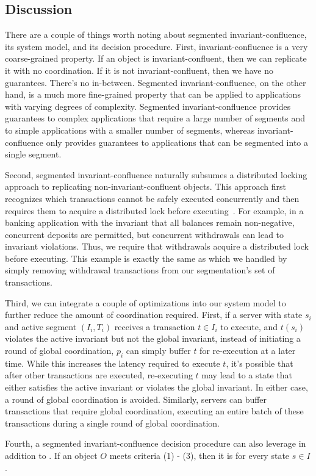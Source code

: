 \subsection{Discussion}
There are a couple of things worth noting about segmented invariant-confluence,
its system model, and its decision procedure. First, invariant-confluence is a
very coarse-grained property. If an object is invariant-confluent, then we can
replicate it with no coordination. If it is not invariant-confluent, then we
have no guarantees. There's no in-between. Segmented invariant-confluence, on
the other hand, is a much more fine-grained property that can be applied to
applications with varying degrees of complexity. Segmented
invariant-confluence provides guarantees to complex applications that require a
large number of segments and to simple applications with a smaller number of
segments, whereas invariant-confluence only provides guarantees to applications
that can be segmented into a single segment.

Second, segmented invariant-confluence naturally subsumes a distributed locking
approach to replicating non-invariant-confluent objects.  This approach first
recognizes which transactions cannot be safely executed concurrently and then
requires them to acquire a distributed lock before
executing~\cite{balegas2015putting, gotsman2016cause}. For example, in a
banking application with the invariant that all balances remain non-negative,
concurrent deposits are permitted, but concurrent withdrawals can lead to
invariant violations. Thus, we require that withdrawals acquire a distributed
lock before executing. This example is exactly the same as
 which we handled by simply removing
withdrawal transactions from our segmentation's set of transactions.

Third, we can integrate a couple of optimizations into our system model to
further reduce the amount of coordination required. First, if a server with
state $s_i$ and active segment $(I_i, T_i)$ receives a transaction $t \in I_i$
to execute, and $t(s_i)$ violates the active invariant but not the global
invariant, instead of initiating a round of global coordination, $p_i$ can
simply buffer $t$ for re-execution at a later time. While this increases the
latency required to execute $t$, it's possible that after other transactions
are executed, re-executing $t$ may lead to a state that either satisfies the
active invariant or violates the global invariant. In either case, a round of
global coordination is avoided. Similarly, servers can buffer transactions that
require global coordination, executing an entire batch of these transactions
during a single round of global coordination.

Fourth, a segmented invariant-confluence decision procedure can also leverage
 in addition to
. If an object $O$ meets
criteria (1) - (3), then it is  for every state $s \in
I$.
